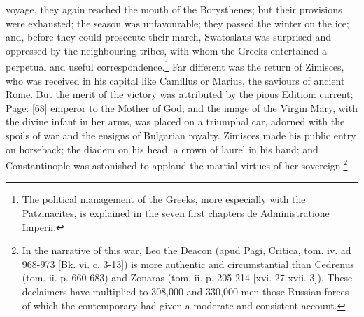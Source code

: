 voyage, they again reached the mouth of the Borysthenes; but their provisions were exhausted; the season was unfavourable; they passed the winter on the ice; and, before they could prosecute their march, Swatoslaus was surprised and oppressed by the neighbouring tribes, with whom the Greeks entertained a perpetual and useful correspondence.\footnote{The political management of the Greeks, more especially with the Patzinacites, is explained in the seven first chapters de Administratione Imperii.} Far different was the return of Zimisces, who was received in his capital like Camillus or Marius, the saviours of ancient Rome. But the merit of the victory was attributed by the pious Edition: current; Page: [68] emperor to the Mother of God; and the image of the Virgin Mary, with the divine infant in her arms, was placed on a triumphal car, adorned with the spoils of war and the ensigns of Bulgarian royalty. Zimisces made his public entry on horseback; the diadem on his head, a crown of laurel in his hand; and Constantinople was astonished to applaud the martial virtues of her sovereign.\footnote{In the narrative of this war, Leo the Deacon (apud Pagi, Critica, tom. iv. ad 968-973 [Bk. vi. c. 3-13]) is more authentic and circumstantial than Cedrenus (tom. ii. p. 660-683) and Zonaras (tom. ii. p. 205-214 [xvi. 27-xvii. 3]). These declaimers have multiplied to 308,000 and 330,000 men those Russian forces of which the contemporary had given a moderate and consistent account.}

